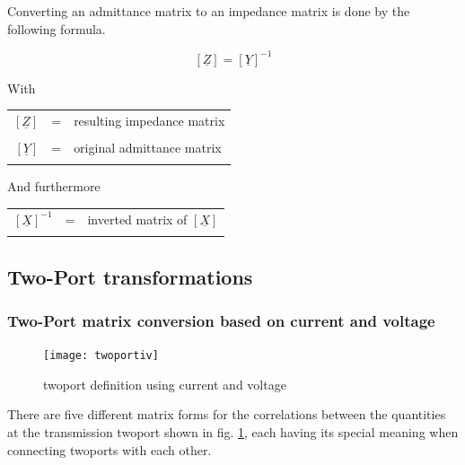 \documentclass[10pt]{report}
\begin{document}
Converting an admittance matrix to an impedance matrix is done by the
following formula.

\begin{equation}
\left[
\underline{Z}
\right]
=
\left[
\underline{Y}
\right]^{-1}
\end{equation}

With

\addvspace{12pt}

\begin{tabular}{rll}
$\left[\underline{Z}\right]$ & = & resulting impedance matrix\\& &\\
$\left[\underline{Y}\right]$ & = & original admittance matrix\\& &\\
\end{tabular}

And furthermore

\addvspace{12pt}

\begin{tabular}{rll}
$\left[\underline{X}\right]^{-1}$ & = & 
inverted matrix of $\left[\underline{X}\right]$\\& &\\
\end{tabular}

\subsection{Two-Port transformations}

\subsubsection{Two-Port matrix conversion based on current and voltage}

\begin{figure}[ht]
\begin{center}
\texttt{[image: twoportiv]}
\end{center}
\caption{twoport definition using current and voltage}
\label{fig:twoportiv}
\end{figure}
\FloatBarrier

There are five different matrix forms for the correlations between the
quantities at the transmission twoport shown in
fig. \ref{fig:twoportiv}, each having its special meaning when
connecting twoports with each other.
\end{document}
